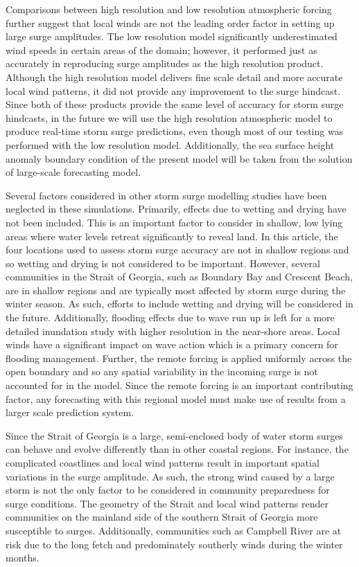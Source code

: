 \documentclass[letterpaper]{tATO2e}
\begin{document}
Comparisons between high resolution and low resolution atmospheric forcing further suggest that local winds are not the leading order factor in setting up large surge amplitudes. The low resolution model significantly underestimated wind speeds in certain areas of the domain; however, it performed just as accurately in reproducing surge amplitudes as the high resolution product.  Although the high resolution model delivers fine scale detail and more accurate local wind patterns, it did not provide any improvement to the surge hindcast. Since both of these products provide the same level of accuracy for storm surge hindcasts, in the future we will use the high resolution atmospheric model to produce real-time storm surge predictions, even though most of our testing was performed with the low resolution model. {\color{red} Additionally, the sea surface height anomaly boundary condition of the present model will be taken from the solution of large-scale forecasting model.}

Several factors considered in other storm surge modelling studies have been neglected in these simulations. Primarily, effects due to wetting and drying have not been included. This is an important factor to consider in shallow, low lying areas where water levels retreat significantly to reveal land. In this article, the four locations used to assess storm surge accuracy are not in shallow regions and so wetting and drying is not considered to be important. However, several communities in the Strait of Georgia, such as Boundary Bay and Crescent Beach, are in shallow regions and are typically most affected by storm surge during the winter season. As such, efforts to include wetting and drying will be considered in the future. Additionally, flooding effects due to wave run up is left for a more detailed inundation study with higher resolution in the near-shore areas. Local winds have a significant impact on wave action which is a primary concern for flooding management. Further, the remote forcing is applied uniformly across the open boundary and so any spatial variability in the incoming surge is not accounted for in the model. Since the remote forcing is an important contributing factor, any forecasting with this regional model must make use of results from a larger scale prediction system. 

Since the Strait of Georgia is a large, semi-enclosed body of water storm surges can behave and evolve differently than in other coastal regions. For instance, the complicated coastlines and local wind patterns result in important spatial variations in the surge amplitude. As such, the strong wind caused by a large storm is not the only factor to be considered in community preparedness for surge conditions. The geometry of the Strait and local wind patterns render communities on the mainland side of the southern Strait of Georgia more susceptible to surges. Additionally, communities such as Campbell River are at risk due to the long fetch and predominately southerly winds during the winter months.
\end{document}
